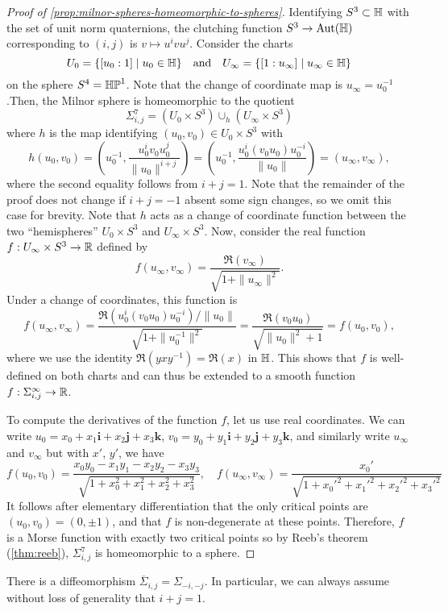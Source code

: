 \begin{proof}[Proof of \cref{prop:milnor-spheres-homeomorphic-to-spheres}]
	Identifying $S^3\subset \mathbb{H}$ with the set of unit norm quaternions, the clutching function $S^3 \to \operatorname{Aut}(\mathbb{H})$ corresponding to $(i,j)$ is $v\mapsto u^ivu^j$. Consider the charts
	\[
		U_0 = \{ [u_0:1] \mid u_0\in \mathbb{H}\}\quad\textrm{and}\quad U_\infty = \{ [1:u_\infty] \mid u_\infty\in \mathbb{H}\}
	\]
	on the sphere $S^4=\mathbb{HP}^1$. Note that the change of coordinate map is $u_\infty=u_0^{-1}$.Then, the Milnor sphere is homeomorphic to the quotient
	\[
		\Sigma^7_{i,j} = (U_0 \times S^3)\cup_h (U_\infty\times S^3)
	\]
	where $h$ is the map identifying $(u_0,v_0)\in U_0\times S^3$ with
	\[
		h(u_0,v_0)= \left(u_0^{-1}, \frac{u_0^iv_0u_0^j}{\|u_0\|^{i+j}}\right) = \left(u_0^{-1}, \frac{u_0^i (v_0u_0) u_0^{-i}}{\|u_0\|}\right) = (u_\infty, v_\infty),
	\]
	where the second equality follows from $i+j=1$. Note that the remainder of the proof does not change if $i+j=-1$ absent some sign changes, so we omit this case for brevity.
	Note that $h$ acts as a change of coordinate function between the two ``hemispheres'' $U_0\times S^3$ and $U_\infty\times S^3$.
	Now, consider the real function $f : U_\infty\times S^3\to \mathbb{R}$ defined by
	\[
		f(u_\infty, v_\infty) = \frac{\Re(v_\infty)}{\sqrt{1+\|u_\infty\|^2}}.
	\]
	Under a change of coordinates, this function is
	\[
		f(u_\infty, v_\infty) = \frac{\Re(u_0^i(v_0u_0)u_0^{-i})/\|u_0\|}{\sqrt{1+\|u_0^{-1}\|^2}} = \frac{\Re(v_0u_0)}{\sqrt{\|u_0\|^2+1}}=f(u_0,v_0),
	\]
	where we use the identity $\Re(yxy^{-1})=\Re(x)$ in $\mathbb{H}$. This shows that $f$ is well-defined on both charts and can thus be extended to a smooth function $f : \Sigma^\infty_{i,j} \to \mathbb{R}$.

	To compute the derivatives of the function $f$, let us use real coordinates. We can write $u_0=x_0+x_1\bm{i}+x_2\bm{j}+x_3\bm{k}$, $v_0 = y_0+y_1\bm{i}+y_2\bm{j}+y_3\bm{k}$, and similarly write $u_\infty$ and $v_\infty$ but with $x'$, $y'$, we have
	\[
		f(u_0, v_0) = \frac{x_0y_0 - x_1y_1 - x_2y_2 - x_3y_3}{\sqrt{1+x_0^2+x_1^2+x_2^2+x_3^2}},\quad
		f(u_\infty, v_\infty) = \frac{x_0'}{\sqrt{1+x_0'^2+x_1'^2+x_2'^2+x_3'^2}}
	\]
	It follows after elementary differentiation that the only critical points are $(u_0, v_0)= (0,\pm 1)$, and that $f$ is non-degenerate at these points. Therefore, $f$ is a Morse function with exactly two critical points so by Reeb's theorem (\ref{thm:reeb}), $\Sigma_{i,j}^7$ is homeomorphic to a sphere.
\end{proof}

\begin{proposition}
There is a diffeomorphism $\overline{\Sigma}_{i,j}=\Sigma_{-i,-j}$. In particular, we can always assume without loss of generality that $i+j=1$.
\end{proposition}


